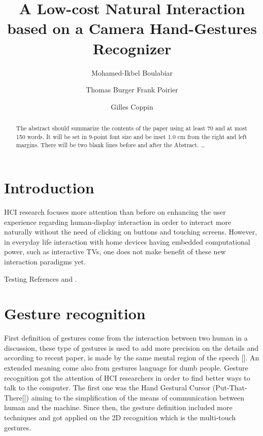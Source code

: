 \documentclass{llncs}
\begin{document}
\frontmatter          %
\pagestyle{headings}  %
\mainmatter              %
%
\title{A Low-cost Natural Interaction based on a Camera Hand-Gestures Recognizer}
\author{Mohamed-Ikbel Boulabiar \and Thomas Burger
Frank Poirier \and Gilles Coppin}
%

\maketitle

\begin{abstract}
The abstract should summarize the contents of the paper
using at least 70 and at most 150 words. It will be set in 9-point
font size and be inset 1.0 cm from the right and left margins.
There will be two blank lines before and after the Abstract. \dots
{}
\end{abstract}
%

\section{Introduction}
HCI research focuses more attention than before on enhancing the user experience regarding human-display interaction in order to interact more naturally without the need of clicking on buttons and touching screens. However, in everyday life interaction with home devices having embedded computational power, such as interactive TVs, one does not make benefit of these new interaction paradigms yet. 

Testing Refrences \cite{Gesturecraft} and \cite{skinColorSeg}.

\section{Gesture recognition}
First definition of gestures come from the interaction between two human in a discussion, these type of gestures is used to add more precision on the details and according to recent paper, is made by the same mental region of the speech []. An extended meaning come also from gestures language for dumb people.
Gesture recognition got the attention of HCI researchers in order to find better ways to talk to the computer. The first one was the Hand Gestural Cursor (Put-That-There[]) aiming to the simplification of the means of communication between human and the machine.
Since then, the gesture definition included more techniques and got applied on the 2D recognition which is the multi-touch gestures.
\end{document}
